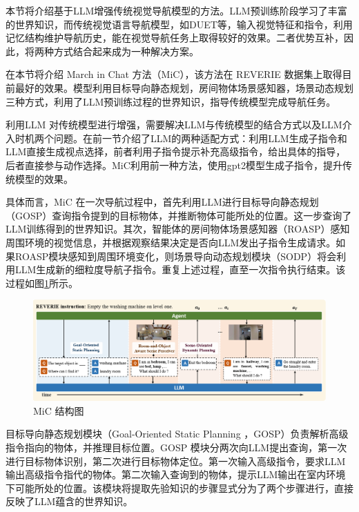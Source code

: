\documentclass[bachelor]{thesis-uestc}
\begin{document}
本节将介绍基于LLM增强传统视觉导航模型的方法。LLM预训练阶段学习了丰富的世界知识，而传统视觉语言导航模型，如DUET等，输入视觉特征和指令，利用记忆结构维护导航历史，能在视觉导航任务上取得较好的效果。二者优势互补，因此，将两种方式结合起来成为一种解决方案。

在本节将介绍 March in Chat 方法（MiC）\cite{qiaoMarchChatInteractive2023}，该方法在 REVERIE 数据集上取得目前最好的效果。模型利用目标导向静态规划，房间物体场景感知器，场景动态规划三种方式，利用了LLM预训练过程的世界知识，指导传统模型完成导航任务。

利用LLM 对传统模型进行增强，需要解决LLM与传统模型的结合方式以及LLM介入时机两个问题。在前一节介绍了LLM的两种适配方式：利用LLM生成子指令和LLM直接生成视点选择，前者利用子指令提示补充高级指令，给出具体的指导，后者直接参与动作选择。MiC利用前一种方法，使用gpt2模型生成子指令，提升传统模型的效果。

具体而言，MiC 在一次导航过程中，首先利用LLM进行目标导向静态规划（GOSP）查询指令提到的目标物体，并推断物体可能所处的位置。这一步查询了LLM训练得到的世界知识。其次，智能体的房间物体场景感知器（ROASP）感知周围环境的视觉信息，并根据观察结果决定是否向LLM发出子指令生成请求。如果ROASP模块感知到周围环境变化，则场景导向动态规划模块（SODP）将会利用LLM生成新的细粒度导航子指令。重复上述过程，直至一次指令执行结束。该过程如图\ref{mic}所示。

\begin {figure}[h]
\centering %
\includegraphics[width=\textwidth]{1424-042816.png}
\caption{MiC 结构图} %
\label{mic}
\end {figure}


目标导向静态规划模块（Goal-Oriented Static Planning ，GOSP）负责解析高级指令指向的物体，并推理目标位置。GOSP 模块分两次向LLM提出查询，第一次进行目标物体识别，第二次进行目标物体定位。第一次输入高级指令，要求LLM输出高级指令指代的物体。第二次输入查询到的物体，提示LLM输出在室内环境下可能所处的位置。该模块将提取先验知识的步骤显式分为了两个步骤进行，直接反映了LLM蕴含的世界知识。
\end{document}
